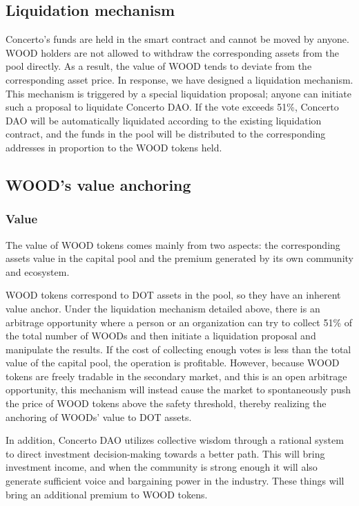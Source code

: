 \documentclass[UTF8]{article}
\begin{document}
\begin{multicols}{2}
\subsection{Liquidation mechanism}
Concerto’s funds are held in the smart contract and cannot be moved by anyone. WOOD holders are not allowed to withdraw the corresponding assets from the pool directly. As a result, the value of WOOD tends to deviate from the corresponding asset price. In response, we have designed a liquidation mechanism. This mechanism is triggered by a special liquidation proposal; anyone can initiate such a proposal to liquidate Concerto DAO. If the vote exceeds 51\%, Concerto DAO will be automatically liquidated according to the existing liquidation contract, and the funds in the pool will be distributed to the corresponding addresses in proportion to the WOOD tokens held.

\subsection{WOOD’s value anchoring}

\subsubsection{Value}
The value of WOOD tokens comes mainly from two aspects: the corresponding assets value in the capital pool and the premium generated by its own community and ecosystem.

WOOD tokens correspond to DOT assets in the pool, so they have an inherent value anchor. Under the liquidation mechanism detailed above, there is an arbitrage opportunity where a person or an organization can try to collect 51\% of the total number of WOODs and then initiate a liquidation proposal and manipulate the results. If the cost of collecting enough votes is less than the total value of the capital pool, the operation is profitable. However, because WOOD tokens are freely tradable in the secondary market, and this is an open arbitrage opportunity, this mechanism will instead cause the market to spontaneously push the price of WOOD tokens above the safety threshold, thereby realizing the anchoring of WOODs’ value to DOT assets.

In addition, Concerto DAO utilizes collective wisdom through a rational system to direct investment decision-making towards a better path. This will bring investment income, and when the community is strong enough it will also generate sufficient voice and bargaining power in the industry. These things will bring an additional premium to WOOD tokens.



\end{multicols}
\end{document}
